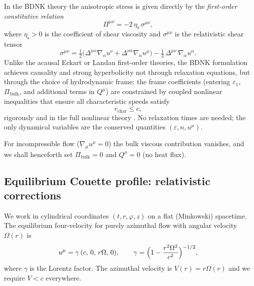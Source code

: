 In the BDNK theory the anisotropic stress is given directly by the
\emph{first-order constitutive relation}
\begin{equation}
\label{eq:rel-7-135}
\Pi^{\mu\nu}
  = -2\,\eta_{\mathrm{s}}\,\sigma^{\mu\nu},
\end{equation}
where $\eta_{\mathrm{s}}>0$ is the coefficient of shear viscosity and
$\sigma^{\mu\nu}$ is the relativistic shear tensor
\begin{equation}
\label{eq:rel-7-136}
\sigma^{\mu\nu}
  = \tfrac{1}{2}\bigl(\Delta^{\mu\alpha}\nabla_{\alpha}u^{\nu}
    + \Delta^{\nu\alpha}\nabla_{\alpha}u^{\mu}\bigr)
  - \tfrac{1}{3}\,\Delta^{\mu\nu}\,\nabla_{\alpha}u^{\alpha}.
\end{equation}
Unlike the acausal Eckart or Landau first-order theories, the BDNK
formulation achieves causality and strong hyperbolicity not through
relaxation equations, but through the choice of hydrodynamic frame:
the frame coefficients (entering $\varepsilon_{1}$, $\Pi_{\mathrm{bulk}}$,
and additional terms in $Q^{\mu}$) are constrained by coupled
nonlinear inequalities that ensure all characteristic speeds satisfy
\begin{equation}
\label{eq:rel-7-137}
v_{\mathrm{char}} \le c,
\end{equation}
rigorously and in the full nonlinear theory
\citep{BemficaDN2018,BemficaDNK2023}.
No relaxation times are needed; the only dynamical variables are the
conserved quantities $(\varepsilon, n, u^{\mu})$.

For incompressible flow ($\nabla_{\mu}u^{\mu}=0$) the bulk
viscous contribution vanishes, and we shall henceforth
set $\Pi_{\mathrm{bulk}}=0$ and $Q^{\mu}=0$ (no heat flux).

\subsection{Equilibrium Couette profile: relativistic
  corrections}\label{sec:rel-7-69b}

We work in cylindrical coordinates $(t,r,\varphi,z)$ on a flat
(Minkowski) spacetime.  The equilibrium four-velocity for purely
azimuthal flow with angular velocity $\Omega(r)$ is
\begin{equation}
\label{eq:rel-7-139}
u^{\mu} = \gamma\,(c,\,0,\,r\Omega,\,0),
\qquad
\gamma = \Bigl(1-\frac{r^{2}\Omega^{2}}{c^{2}}\Bigr)^{-1/2},
\end{equation}
where $\gamma$ is the Lorentz factor.  The azimuthal velocity is
$V(r)=r\Omega(r)$ and we require $V<c$ everywhere.

